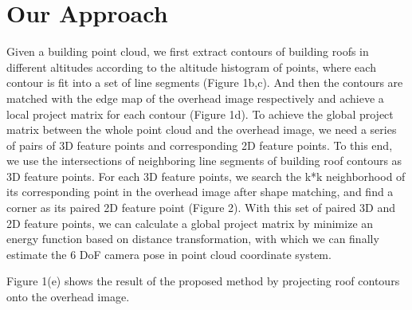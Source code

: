 \documentclass[tog]{acmsiggraph}
\begin{document}
\section{Our Approach}
Given a building point cloud, we first extract contours of building roofs in different altitudes according to the altitude histogram of points, where each contour is fit into a set of line segments (Figure 1b,c). And then the contours are matched with the edge map of the overhead image respectively and achieve a local project matrix for each contour (Figure 1d). To achieve the global project matrix between the whole point cloud and the overhead image, we need a series of pairs of 3D feature points and corresponding 2D feature points. To this end, we use the intersections of neighboring line segments of building roof contours as 3D feature points. 
For each 3D feature points, we search the k*k neighborhood of its corresponding point in the overhead image after shape matching, and find a corner as its paired 2D feature point (Figure 2).
With this set of paired 3D and 2D feature points, we can calculate a global project matrix by minimize an energy function based on distance transformation, with which we can finally estimate the 6 DoF camera pose in point cloud coordinate system.

Figure 1(e) shows the result of the proposed method by projecting roof contours onto the overhead image. 



	
	
\end{document}
